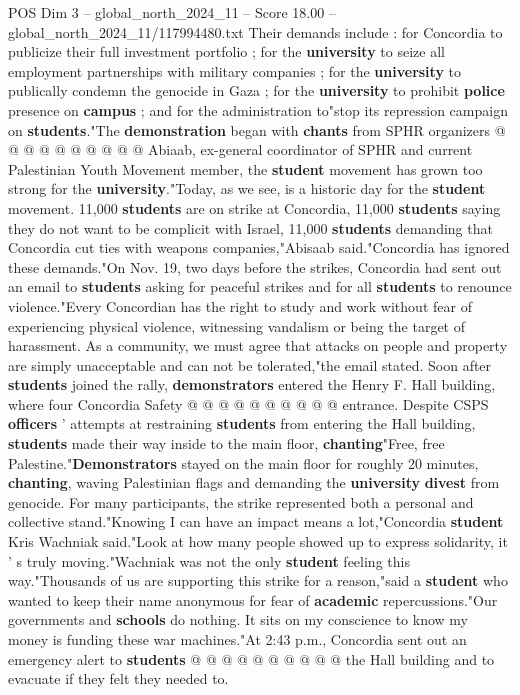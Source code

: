 \begin{textsample}{POS Dim 3 – global\_north\_2024\_11 – Score 18.00 – global\_north\_2024\_11/117994480.txt}
Their demands include : for Concordia to publicize their full investment portfolio ; for the \textbf{university} to seize all employment partnerships with military companies ; for the \textbf{university} to publically condemn the genocide in Gaza ; for the \textbf{university} to prohibit \textbf{police} presence on \textbf{campus} ; and for the administration to"stop its repression campaign on \textbf{students}."The \textbf{demonstration} began with \textbf{chants} from SPHR organizers @ @ @ @ @ @ @ @ @ @ Abiaab, ex-general coordinator of SPHR and current Palestinian Youth Movement member, the \textbf{student} movement has grown too strong for the \textbf{university}."Today, as we see, is a historic day for the \textbf{student} movement. 11,000 \textbf{students} are on strike at Concordia, 11,000 \textbf{students} saying they do not want to be complicit with Israel, 11,000 \textbf{students} demanding that Concordia cut ties with weapons companies,"Abisaab said."Concordia has ignored these demands."On Nov. 19, two days before the strikes, Concordia had sent out an email to \textbf{students} asking for peaceful strikes and for all \textbf{students} to renounce violence."Every Concordian has the right to study and work without fear of experiencing physical violence, witnessing vandalism or being the target of harassment.
As a community, we must agree that attacks on people and property are simply unacceptable and can not be tolerated,"the email stated.
Soon after \textbf{students} joined the rally, \textbf{demonstrators} entered the Henry F.
Hall building, where four Concordia Safety @ @ @ @ @ @ @ @ @ @ entrance.
Despite CSPS \textbf{officers} ' attempts at restraining \textbf{students} from entering the Hall building, \textbf{students} made their way inside to the main floor, \textbf{chanting}"Free, free Palestine."\textbf{Demonstrators} stayed on the main floor for roughly 20 minutes, \textbf{chanting}, waving Palestinian flags and demanding the \textbf{university} \textbf{divest} from genocide.
For many participants, the strike represented both a personal and collective stand."Knowing I can have an impact means a lot,"Concordia \textbf{student} Kris Wachniak said."Look at how many people showed up to express solidarity, it ' s truly moving."Wachniak was not the only \textbf{student} feeling this way."Thousands of us are supporting this strike for a reason,"said a \textbf{student} who wanted to keep their name anonymous for fear of \textbf{academic} repercussions."Our governments and \textbf{schools} do nothing.
It sits on my conscience to know my money is funding these war machines."At 2:43 p.m., Concordia sent out an emergency alert to \textbf{students} @ @ @ @ @ @ @ @ @ @ the Hall building and to evacuate if they felt they needed to.

\end{textsample}
